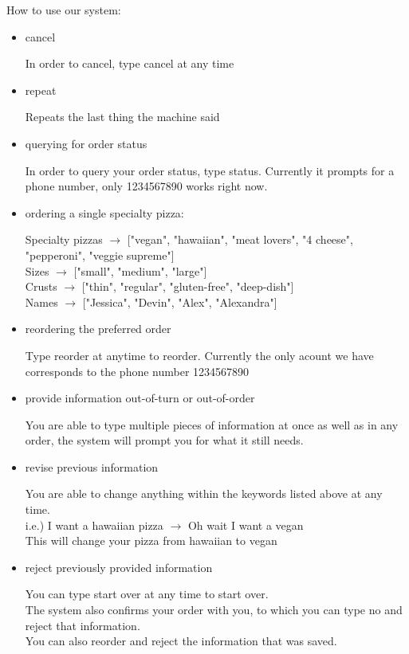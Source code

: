 \documentclass{article}
\begin{document}
How to use our system:
\begin{itemize}

	\item cancel

In order to cancel, type cancel at any time

	\item repeat
	
Repeats the last thing the machine said

	\item querying for order status

In order to query your order status, type status.
Currently it prompts for a phone number, only 1234567890 works right now.

	\item ordering a single specialty pizza:
	
Specialty pizzas $\rightarrow$ ["vegan", "hawaiian", "meat lovers", "4 cheese", "pepperoni", "veggie supreme"]\\
Sizes $\rightarrow$ ["small", "medium", "large"]\\
Crusts $\rightarrow$ ["thin", "regular", "gluten-free", "deep-dish"]\\
Names $\rightarrow$ ["Jessica", "Devin", "Alex", "Alexandra"]\\

	\item reordering the preferred order
	
Type reorder at anytime to reorder. Currently the only acount we have corresponds to the phone number 1234567890

	\item provide information out-of-turn or out-of-order
	
You are able to type multiple pieces of information at once as well as in any order, the system will prompt you for what it still needs.

	\item revise previous information
	
You are able to change anything within the keywords listed above at any time.\\
i.e.) I want a hawaiian pizza $\rightarrow$ Oh wait I want a vegan\\
This will change your pizza from hawaiian to vegan

	\item reject previously provided information
	
You can type start over at any time to start over.\\
The system also confirms your order with you, to which you can type no and reject that information.\\
You can also reorder and reject the information that was saved.

\end{itemize}
\end{document}
